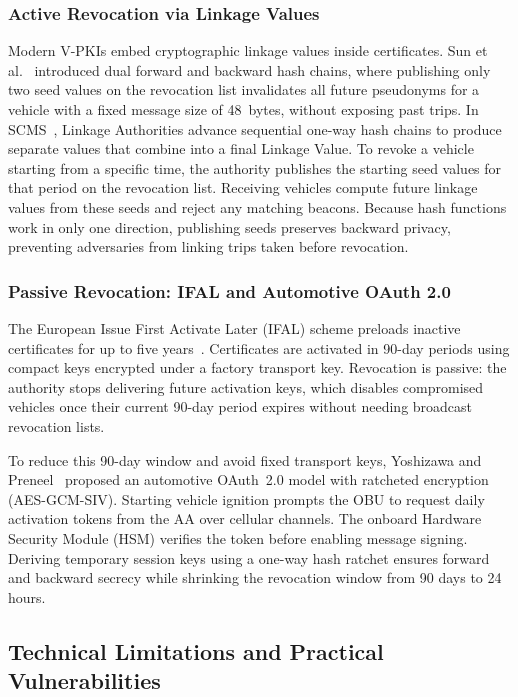 \subsubsection{Active Revocation via Linkage Values}
Modern V-PKIs embed cryptographic linkage values inside certificates.
Sun et al.~\cite{sun2010efficient} introduced dual forward and backward hash chains, where publishing only two seed values on the revocation list invalidates all future pseudonyms for a vehicle with a fixed message size of 48~bytes, without exposing past trips.
In SCMS~\cite{brecht2018scms}, Linkage Authorities advance sequential one-way hash chains to produce separate values that combine into a final Linkage Value.
To revoke a vehicle starting from a specific time, the authority publishes the starting seed values for that period on the revocation list.
Receiving vehicles compute future linkage values from these seeds and reject any matching beacons.
Because hash functions work in only one direction, publishing seeds preserves backward privacy, preventing adversaries from linking trips taken before revocation.

\subsubsection{Passive Revocation: IFAL and Automotive OAuth 2.0}
The European Issue First Activate Later (IFAL) scheme preloads inactive certificates for up to five years~\cite{yoshizawa2023new}.
Certificates are activated in 90-day periods using compact keys encrypted under a factory transport key.
Revocation is passive: the authority stops delivering future activation keys, which disables compromised vehicles once their current 90-day period expires without needing broadcast revocation lists.

To reduce this 90-day window and avoid fixed transport keys, Yoshizawa and Preneel~\cite{yoshizawa2023new} proposed an automotive OAuth~2.0 model with ratcheted encryption (AES-GCM-SIV).
Starting vehicle ignition prompts the OBU to request daily activation tokens from the AA over cellular channels.
The onboard Hardware Security Module (HSM) verifies the token before enabling message signing.
Deriving temporary session keys using a one-way hash ratchet ensures forward and backward secrecy while shrinking the revocation window from 90 days to 24 hours.

\subsection{Technical Limitations and Practical Vulnerabilities}
\label{subsec:limitations_and_vulnerabilities}

